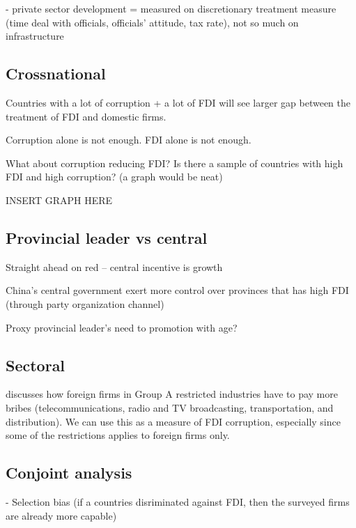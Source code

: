 \documentclass[12pt]{article}
\begin{document}
- private sector development = measured on discretionary treatment measure (time deal with officials, officials' attitude, tax rate), not so much on infrastructure

\subsection{Crossnational}

Countries with a lot of corruption + a lot of FDI will see larger gap between the treatment of FDI and domestic firms.

Corruption alone is not enough. FDI alone is not enough.

What about corruption reducing FDI? Is there a sample of countries with high FDI and high corruption? (a graph would be neat)

INSERT GRAPH HERE


\subsection{Provincial leader vs central}

\citep{Malesky2008} Straight ahead on red -- central incentive is growth

\citep{Sheng2007} China's central government exert more control over provinces that has high FDI (through party organization channel)

Proxy provincial leader's need to promotion with age?

\subsection{Sectoral}

\citep{Malesky2015} discusses how foreign firms in Group A restricted industries have to pay more bribes (telecommunications, radio and TV broadcasting, transportation, and distribution). We can use this as a measure of FDI corruption, especially since some of the restrictions applies to foreign firms only.


\subsection{Conjoint analysis}



- Selection bias (if a countries disriminated against FDI, then the surveyed firms are already more capable)


\end{document}
